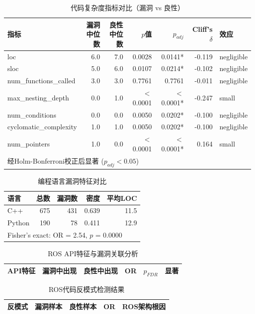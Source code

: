 \begin{table}[htbp]
\centering
\caption{代码复杂度指标对比（漏洞 vs 良性）}
\label{tab:complexity}
\begin{tabular}{lrrrrrl}
\toprule
指标 & 漏洞中位数 & 良性中位数 & $p$值 & $p_{adj}$ & Cliff's $\delta$ & 效应 \\
\midrule
loc & 6.0 & 7.0 & 0.0028 & 0.0141* & -0.119 & negligible \\
sloc & 5.0 & 6.0 & 0.0107 & 0.0214* & -0.102 & negligible \\
num_functions_called & 3.0 & 3.0 & 0.7761 & 0.7761 & -0.011 & negligible \\
max_nesting_depth & 0.0 & 1.0 & $<$0.0001 & $<$0.0001* & -0.247 & small \\
num_conditions & 0.0 & 0.0 & 0.0050 & 0.0202* & -0.100 & negligible \\
cyclomatic_complexity & 1.0 & 1.0 & 0.0050 & 0.0202* & -0.100 & negligible \\
num_pointers & 1.0 & 0.0 & $<$0.0001 & $<$0.0001* & 0.164 & small \\
\bottomrule
\multicolumn{7}{l}{\footnotesize * 经Holm-Bonferroni校正后显著 ($p_{adj} < 0.05$)} \\
\end{tabular}
\end{table}

\begin{table}[htbp]
\centering
\caption{编程语言漏洞特征对比}
\label{tab:language}
\begin{tabular}{lrrrr}
\toprule
语言 & 总数 & 漏洞数 & 密度 & 平均LOC \\
\midrule
C++ & 675 & 431 & 0.639 & 11.5 \\
Python & 190 & 78 & 0.411 & 12.9 \\
\midrule
\multicolumn{5}{l}{Fisher's exact: OR = 2.54, $p$ = 0.0000} \\
\bottomrule
\end{tabular}
\end{table}

\begin{table}[htbp]
\centering
\caption{ROS API特征与漏洞关联分析}
\label{tab:api_features}
\begin{tabular}{lrrrrl}
\toprule
API特征 & 漏洞中出现 & 良性中出现 & OR & $p_{FDR}$ & 显著 \\
\midrule
\bottomrule
\end{tabular}
\end{table}

\begin{table}[htbp]
\centering
\caption{ROS代码反模式检测结果}
\label{tab:antipatterns}
\begin{tabular}{lrrrl}
\toprule
反模式 & 漏洞样本 & 良性样本 & OR & ROS架构根因 \\
\midrule
\bottomrule
\end{tabular}
\end{table}

